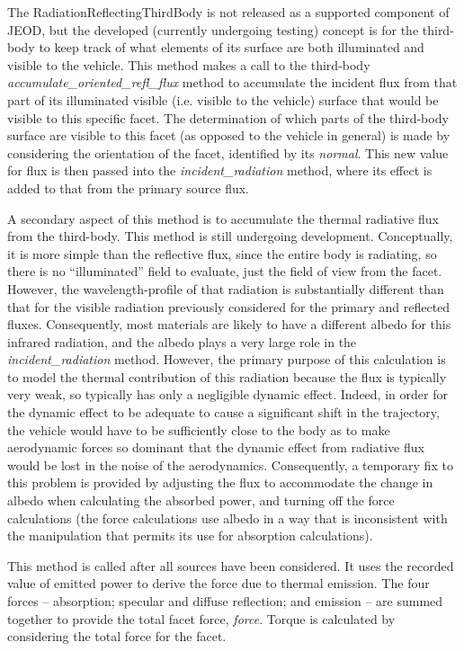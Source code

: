 {\begin{enumerate}
\begin{enumerate}
The RadiationReflectingThirdBody is not released as a supported component of
JEOD, but the developed (currently undergoing testing) concept is for the
third-body to keep track of what elements of its surface are both illuminated
and visible to the vehicle.  This method makes a call to the third-body
\textit{accumulate\_oriented\_refl\_flux} method to accumulate the incident
flux from that part of its illuminated visible (i.e. visible to the vehicle)
surface that would be visible to this specific facet.  The determination of
which parts of the third-body surface are visible to this facet (as opposed to
the vehicle in general) is made by considering the orientation of the facet,
identified by its \textit{normal}.  This new value for flux is then passed into
the \textit{incident\_radiation} method, where its effect is added to that from
the primary source flux.

A secondary aspect of this method is to accumulate the thermal radiative flux
from the third-body.  This method is still undergoing development.
Conceptually, it is more simple than the reflective flux, since the entire body
is radiating, so there is no ``illuminated'' field to evaluate, just the field
of view from the facet.  However, the wavelength-profile of that radiation is
substantially different than that for the visible radiation previously
considered for the primary and reflected fluxes. Consequently, most materials
are likely to have a different albedo for this infrared radiation, and the
albedo plays a very large role in the \textit{incident\_radiation} method.
However, the primary purpose of this calculation is to model the thermal
contribution of this radiation because the flux is typically very weak, so
typically has only a negligible dynamic effect. Indeed, in order for the
dynamic effect to be adequate to cause a significant shift in the trajectory,
the vehicle would have to be sufficiently close to the body as to make
aerodynamic forces so dominant that the dynamic effect from radiative flux
would be lost in the noise of the aerodynamics.  Consequently, a temporary fix
to this problem is provided by adjusting the flux to accommodate the change in
albedo when calculating the absorbed power, and turning off the force
calculations (the force calculations use albedo in a way that is inconsistent
with the manipulation that permits its use for absorption calculations).

This method is called after all sources have been considered.  It uses the
recorded value of
emitted power to derive the force due to thermal
emission.   The four forces -- absorption; specular and diffuse reflection; and
emission -- are summed together to provide the total facet force, \textit{force}.
Torque is calculated
by considering the total force for the facet.


\end{enumerate}
\end{enumerate}}
